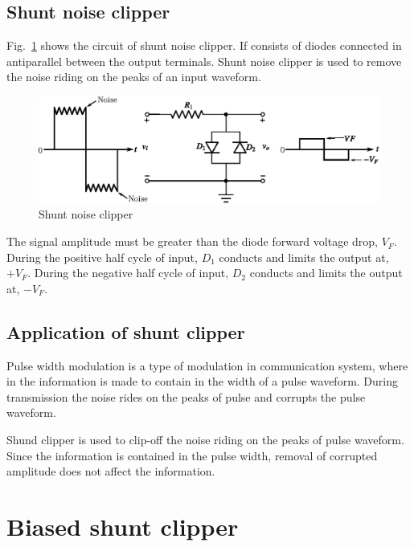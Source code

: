 \eject

\subsection{Shunt noise clipper}\label{sec2.31.5}

Fig.~\ref{fig2.34} shows the circuit of shunt noise clipper. If consists of diodes connected in antiparallel between the output terminals. Shunt noise clipper is used to remove the noise riding on the peaks of an input waveform.
\begin{figure}[H]
\centering
\includegraphics[scale=.97]{chap2/fig2.34.eps}
\caption{Shunt noise clipper}\label{fig2.34}
\end{figure}

The signal amplitude must be greater than the diode forward voltage drop, $V_{F}$. During the positive half cycle of input, $D_{1}$ conducts and limits the output at, $+V_{F}$. During the negative half cycle of input, $D_{2}$ conducts and limits the output at, $-V_{F}$.\\[-20pt]

\subsection{Application of shunt clipper}\label{sec2.31.6}

Pulse width modulation is a type of modulation in communication system, where in the information is made to contain in the width of a pulse waveform. During transmission the noise rides on the peaks of pulse and corrupts the pulse waveform. 

Shund clipper is used to clip-off the noise riding on the peaks of pulse waveform. Since the information is contained in the pulse width, removal of corrupted amplitude does not affect the information.\\[-20pt]

\section{Biased shunt clipper}\label{sec2.32}

